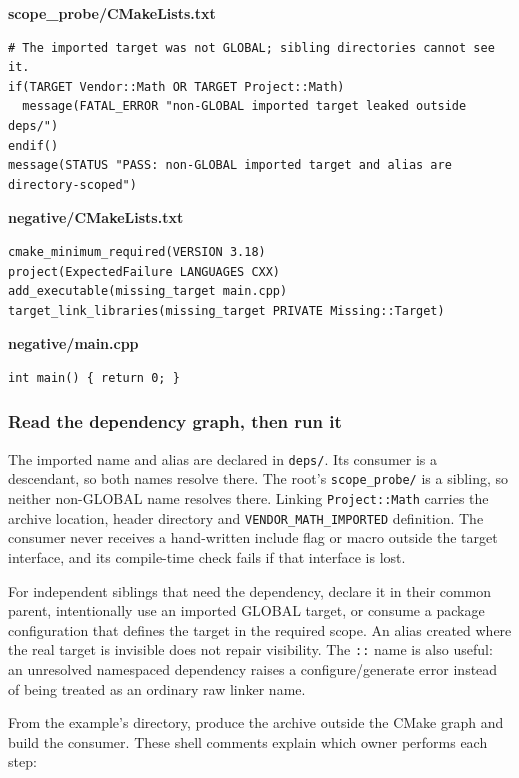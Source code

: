 \textbf{scope\_probe/CMakeLists.txt}

\begin{verbatim}
# The imported target was not GLOBAL; sibling directories cannot see it.
if(TARGET Vendor::Math OR TARGET Project::Math)
  message(FATAL_ERROR "non-GLOBAL imported target leaked outside deps/")
endif()
message(STATUS "PASS: non-GLOBAL imported target and alias are directory-scoped")
\end{verbatim}

\textbf{negative/CMakeLists.txt}

\begin{verbatim}
cmake_minimum_required(VERSION 3.18)
project(ExpectedFailure LANGUAGES CXX)
add_executable(missing_target main.cpp)
target_link_libraries(missing_target PRIVATE Missing::Target)
\end{verbatim}

\textbf{negative/main.cpp}

\begin{verbatim}
int main() { return 0; }
\end{verbatim}

\subsubsection{Read the dependency graph, then run it}\label{05-engine-i-ch012-read-the-dependency-graph-then-run-it}

The imported name and alias are declared in \texttt{deps/}. Its consumer is a descendant, so both names resolve there. The root's \texttt{scope\_probe/} is a sibling, so neither non-GLOBAL name resolves there. Linking \texttt{Project::Math} carries the archive location, header directory and \texttt{VENDOR\_MATH\_IMPORTED} definition. The consumer never receives a hand-written include flag or macro outside the target interface, and its compile-time check fails if that interface is lost.

For independent siblings that need the dependency, declare it in their common parent, intentionally use an imported GLOBAL target, or consume a package configuration that defines the target in the required scope. An alias created where the real target is invisible does not repair visibility. The \texttt{::} name is also useful: an unresolved namespaced dependency raises a configure/generate error instead of being treated as an ordinary raw linker name.

From the example's directory, produce the archive outside the CMake graph and build the consumer. These shell comments explain which owner performs each step:

